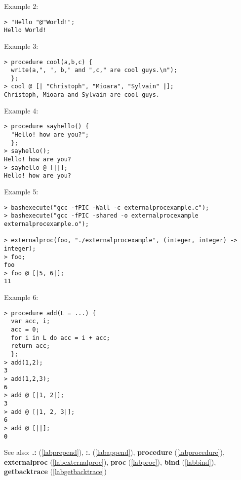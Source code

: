 \noindent Example 2: 
\begin{center}\begin{minipage}{15cm}\begin{Verbatim}[frame=single]
> "Hello "@"World!";
Hello World!
\end{Verbatim}
\end{minipage}\end{center}
\noindent Example 3: 
\begin{center}\begin{minipage}{15cm}\begin{Verbatim}[frame=single]
> procedure cool(a,b,c) { 
  write(a,", ", b," and ",c," are cool guys.\n");
  };
> cool @ [| "Christoph", "Mioara", "Sylvain" |];
Christoph, Mioara and Sylvain are cool guys.
\end{Verbatim}
\end{minipage}\end{center}
\noindent Example 4: 
\begin{center}\begin{minipage}{15cm}\begin{Verbatim}[frame=single]
> procedure sayhello() { 
  "Hello! how are you?";
  };
> sayhello();
Hello! how are you?
> sayhello @ [||];
Hello! how are you?
\end{Verbatim}
\end{minipage}\end{center}
\noindent Example 5: 
\begin{center}\begin{minipage}{15cm}\begin{Verbatim}[frame=single]
> bashexecute("gcc -fPIC -Wall -c externalprocexample.c");
> bashexecute("gcc -fPIC -shared -o externalprocexample externalprocexample.o");

> externalproc(foo, "./externalprocexample", (integer, integer) -> integer);
> foo;
foo
> foo @ [|5, 6|];
11
\end{Verbatim}
\end{minipage}\end{center}
\noindent Example 6: 
\begin{center}\begin{minipage}{15cm}\begin{Verbatim}[frame=single]
> procedure add(L = ...) {
  var acc, i;
  acc = 0;
  for i in L do acc = i + acc;
  return acc;
  };
> add(1,2);
3
> add(1,2,3);
6
> add @ [|1, 2|];
3
> add @ [|1, 2, 3|];
6
> add @ [||];
0
\end{Verbatim}
\end{minipage}\end{center}
See also: \textbf{.:} (\ref{labprepend}), \textbf{:.} (\ref{labappend}), \textbf{procedure} (\ref{labprocedure}), \textbf{externalproc} (\ref{labexternalproc}), \textbf{proc} (\ref{labproc}), \textbf{bind} (\ref{labbind}), \textbf{getbacktrace} (\ref{labgetbacktrace})

